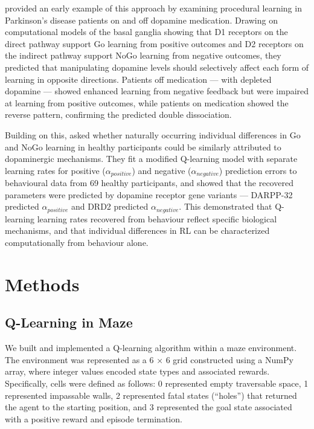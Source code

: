 \documentclass[
  authoryear,
  preprint]{elsarticle}
\begin{document}
\citet{Frank2004} provided an early example of this approach by
examining procedural learning in Parkinson's disease patients on and off
dopamine medication. Drawing on computational models of the basal
ganglia showing that D1 receptors on the direct pathway support Go
learning from positive outcomes and D2 receptors on the indirect pathway
support NoGo learning from negative outcomes, they predicted that
manipulating dopamine levels should selectively affect each form of
learning in opposite directions. Patients off medication --- with
depleted dopamine --- showed enhanced learning from negative feedback
but were impaired at learning from positive outcomes, while patients on
medication showed the reverse pattern, confirming the predicted double
dissociation.

Building on this, \citet{Frank2007} asked whether naturally occurring
individual differences in Go and NoGo learning in healthy participants
could be similarly attributed to dopaminergic mechanisms. They fit a
modified Q-learning model with separate learning rates for positive
(\(\alpha_{positive}\)) and negative (\(\alpha_{negative}\)) prediction
errors to behavioural data from 69 healthy participants, and showed that
the recovered parameters were predicted by dopamine receptor gene
variants --- DARPP-32 predicted \(\alpha_{positive}\) and DRD2 predicted
\(\alpha_{negative}\). This demonstrated that Q-learning learning rates
recovered from behaviour reflect specific biological mechanisms, and
that individual differences in RL can be characterized computationally
from behaviour alone.

\section{Methods}\label{methods}

\subsection{Q-Learning in Maze}\label{sec-implementation}

We built and implemented a Q-learning algorithm within a maze
environment. The environment was represented as a 6 × 6 grid constructed
using a NumPy array, where integer values encoded state types and
associated rewards. Specifically, cells were defined as follows: 0
represented empty traversable space, 1 represented impassable walls, 2
represented fatal states (``holes'') that returned the agent to the
starting position, and 3 represented the goal state associated with a
positive reward and episode termination.
\end{document}
